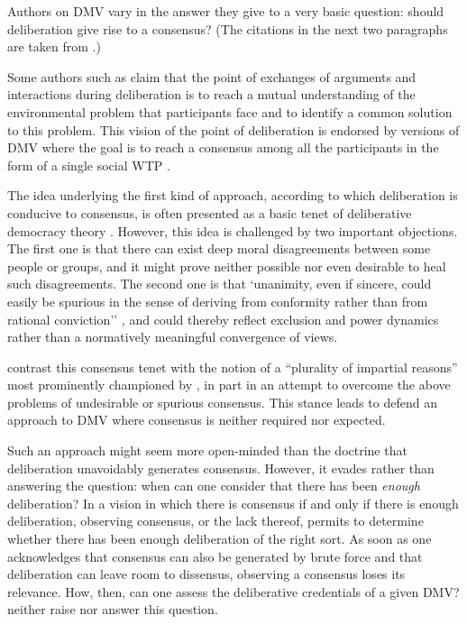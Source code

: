 \documentclass[version=3.21, pagesize, twoside=off, bibliography=totoc, DIV=calc, fontsize=12pt, a4paper, french, english]{scrartcl}
\begin{document}
Authors on DMV vary in the answer they give to a very basic question: should deliberation give rise to a consensus? (The citations in the next two paragraphs are taken from \citet{bartkowski_beyond_2018}.)

Some authors such as \citet{vatn_institutional_2009} claim that the point of exchanges of arguments and interactions during deliberation is to reach a mutual understanding of the environmental problem that participants face and to identify a common solution to this problem. 
This vision of the point of deliberation is endorsed by versions of DMV where the goal is to reach a consensus among all the participants in the form of a single social WTP \citep{orchard-webb_deliberative_2016}.


The idea underlying the first kind of approach, according to which deliberation is conducive to consensus, is often presented as a basic tenet of deliberative democracy theory \citep{wilson_discourse-based_2002}. 
However, this idea is challenged by two important objections.
The first one is that there can exist deep moral disagreements \citep{dryzek_deliberative_2013} between some people or groups, and it might prove neither possible nor even desirable to heal such disagreements.
The second one is that `unanimity, even if sincere, could easily be spurious in the sense of deriving from conformity rather than from rational conviction'' \citep{elster_sour_1983}, and could thereby reflect exclusion and power dynamics \citep{volker_exploring_2016,vargas_background_2016,vargas_problem_2017} rather than a normatively meaningful convergence of views.

\citeauthor{bartkowski_beyond_2018} contrast this consensus tenet with the notion of a ``plurality of impartial reasons'' most prominently championed by \citet{sen_idea_2009}, in part in an attempt to overcome the above problems of undesirable or spurious consensus.
This stance leads \citeauthor{bartkowski_beyond_2018} to defend an approach to DMV where consensus is neither required nor expected. 

Such an approach might seem more open-minded than the doctrine that deliberation unavoidably generates consensus. However, it evades rather than answering the question: when can one consider that there has been \emph{enough} deliberation? 
In a vision in which there is consensus if and only if there is enough deliberation, observing consensus, or the lack thereof, permits to determine whether there has been enough deliberation of the right sort. 
As soon as one acknowledges that consensus can also be generated by brute force and that deliberation can leave room to dissensus, observing a consensus loses its relevance. 
How, then, can one assess the deliberative credentials of a given DMV? 
\citeauthor{bartkowski_beyond_2018} neither raise nor answer this question.
\end{document}
